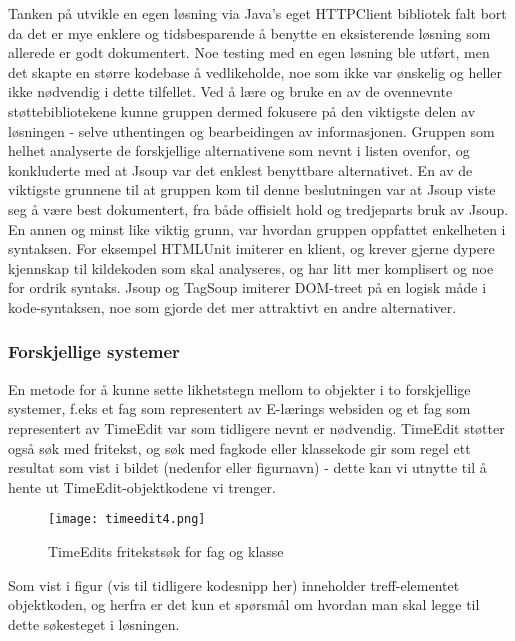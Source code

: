 \documentclass[../main.tex]{subfiles}
\begin{document}
Tanken på utvikle en egen løsning via Java’s eget HTTPClient bibliotek falt bort da det er mye enklere og tidsbesparende å benytte en eksisterende løsning som allerede er godt dokumentert. Noe testing med en egen løsning ble utført, men det skapte en større kodebase å vedlikeholde, noe som ikke var ønskelig og heller ikke nødvendig i dette tilfellet. Ved å lære og bruke en av de ovennevnte støttebibliotekene kunne gruppen dermed fokusere på den viktigste delen av løsningen - selve uthentingen og bearbeidingen av informasjonen.\newline
\newline
Gruppen som helhet analyserte de forskjellige alternativene som nevnt i listen ovenfor, og konkluderte med at Jsoup var det enklest benyttbare alternativet. En av de viktigste grunnene til at gruppen kom til denne beslutningen var at Jsoup viste seg å være best dokumentert, fra både offisielt hold og tredjeparts bruk av Jsoup.
En annen og minst like viktig grunn, var hvordan gruppen oppfattet enkelheten i syntaksen. For eksempel HTMLUnit imiterer en klient, og krever gjerne dypere kjennskap til kildekoden som skal analyseres, og har litt mer komplisert og noe for ordrik syntaks. Jsoup og TagSoup imiterer DOM-treet på en logisk måde i kode-syntaksen, noe som gjorde det mer attraktivt en andre alternativer.

\subsubsection{Forskjellige systemer}

En metode for å kunne sette likhetstegn mellom to objekter i to forskjellige systemer, f.eks et fag som representert av E-lærings websiden og et fag som representert av TimeEdit var som tidligere nevnt er nødvendig.\newline
\newline
TimeEdit støtter også søk med fritekst, og søk med fagkode eller klassekode gir som regel ett resultat som vist i bildet (nedenfor eller figurnavn) - dette kan vi utnytte til å hente ut TimeEdit-objektkodene vi trenger.

\begin{figure}[H]
  \centering
  \texttt{[image: timeedit4.png]}
  \caption{TimeEdits fritekstsøk for fag og klasse}
\end{figure}

Som vist i figur (vis til tidligere kodesnipp her) inneholder treff-elementet objektkoden, og herfra er det kun et spørsmål om hvordan man skal legge til dette søkesteget i løsningen.
\end{document}
